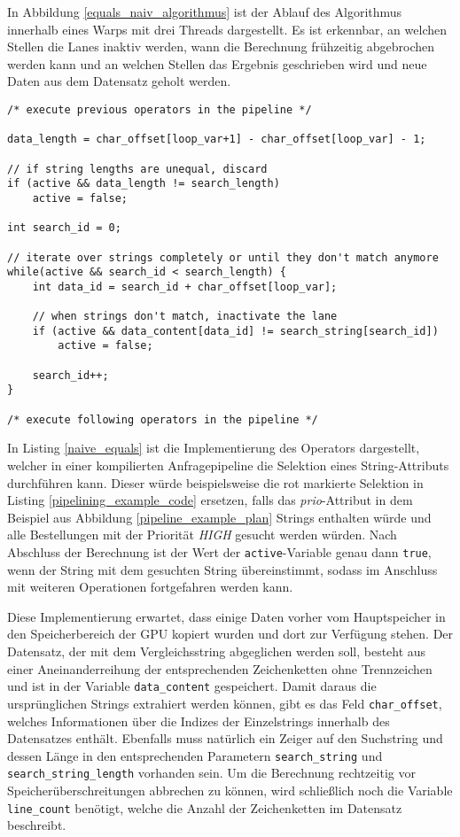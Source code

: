 In Abbildung \ref{equals_naiv_algorithmus} ist der Ablauf des Algorithmus innerhalb eines Warps mit drei Threads dargestellt.
Es ist erkennbar, an welchen Stellen die Lanes inaktiv werden, wann die Berechnung frühzeitig abgebrochen werden kann und an welchen Stellen das Ergebnis geschrieben wird und neue Daten aus dem Datensatz geholt werden.

\newpage

\begin{lstlisting}[language=MyC++,
	caption=Naive Implementierung einer Selektion von Strings,
	label=naive_equals]
/* execute previous operators in the pipeline */

data_length = char_offset[loop_var+1] - char_offset[loop_var] - 1;

// if string lengths are unequal, discard
if (active && data_length != search_length)
	active = false;

int search_id = 0;

// iterate over strings completely or until they don't match anymore
while(active && search_id < search_length) {
	int data_id = search_id + char_offset[loop_var];
	
	// when strings don't match, inactivate the lane
	if (active && data_content[data_id] != search_string[search_id])
		active = false;
	
	search_id++;
}

/* execute following operators in the pipeline */
\end{lstlisting}

In Listing \ref{naive_equals} ist die Implementierung des Operators dargestellt, welcher in einer kompilierten Anfragepipeline die Selektion eines String-Attributs durchführen kann.
Dieser würde beispielsweise die rot markierte Selektion in Listing \ref{pipelining_example_code} ersetzen, falls das \emph{prio}-Attribut in dem Beispiel aus Abbildung \ref{pipeline_example_plan} Strings enthalten würde und alle Bestellungen mit der Priorität \emph{HIGH} gesucht werden würden.
Nach Abschluss der Berechnung ist der Wert der \texttt{active}-Variable genau dann \texttt{true}, wenn der String mit dem gesuchten String übereinstimmt, sodass im Anschluss mit weiteren Operationen fortgefahren werden kann.

Diese Implementierung erwartet, dass einige Daten vorher vom Hauptspeicher in den Speicherbereich der GPU kopiert wurden und dort zur Verfügung stehen.
Der Datensatz, der mit dem Vergleichsstring abgeglichen werden soll, besteht aus einer Aneinanderreihung der entsprechenden Zeichenketten ohne Trennzeichen und ist in der Variable \texttt{data\_content} gespeichert.
Damit daraus die ursprünglichen Strings extrahiert werden können, gibt es das Feld \texttt{char\_offset}, welches Informationen über die Indizes der Einzelstrings innerhalb des Datensatzes enthält.
Ebenfalls muss natürlich ein Zeiger auf den Suchstring und dessen Länge in den entsprechenden Parametern \texttt{search\_string} und \texttt{search\_string\_length} vorhanden sein.
Um die Berechnung rechtzeitig vor Speicherüberschreitungen abbrechen zu können, wird schließlich noch die Variable \texttt{line\_count} benötigt, welche die Anzahl der Zeichenketten im Datensatz beschreibt.

